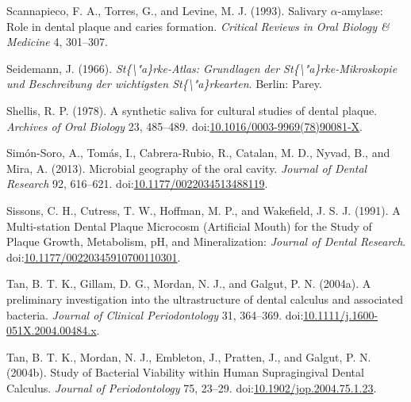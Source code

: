 \documentclass[utf8]{frontiers/frontiersSCNS}
\newlength{\cslhangindent}
\newlength{\cslentryspacingunit} %
\newenvironment{CSLReferences}[2] %
 {%
  \setlength{\parindent}{0pt}
  \ifodd #1
  \let\oldpar\par
  \def\par{\hangindent=\cslhangindent\oldpar}
  \fi
  \setlength{\parskip}{#2\cslentryspacingunit}
 }%
 {}
\begin{document}
\begin{CSLReferences}{1}{0}
\leavevmode{}%
Scannapieco, F. A., Torres, G., and Levine, M. J. (1993). Salivary {\(\alpha\)}-amylase: Role in dental plaque and caries formation. \emph{Critical Reviews in Oral Biology \& Medicine} 4, 301--307.

\leavevmode{}%
Seidemann, J. (1966). \emph{St\{\textbackslash"a\}rke-{Atlas}: {Grundlagen} der {St}\{\textbackslash"a\}rke-{Mikroskopie} und {Beschreibung} der wichtigsten {St}\{\textbackslash"a\}rkearten}. {Berlin}: {Parey}.

\leavevmode{}%
Shellis, R. P. (1978). A synthetic saliva for cultural studies of dental plaque. \emph{Archives of Oral Biology} 23, 485--489. doi:\href{https://doi.org/10.1016/0003-9969(78)90081-X}{10.1016/0003-9969(78)90081-X}.

\leavevmode{}%
Simón-Soro, A., Tomás, I., Cabrera-Rubio, R., Catalan, M. D., Nyvad, B., and Mira, A. (2013). Microbial geography of the oral cavity. \emph{Journal of Dental Research} 92, 616--621. doi:\href{https://doi.org/10.1177/0022034513488119}{10.1177/0022034513488119}.

\leavevmode{}%
Sissons, C. H., Cutress, T. W., Hoffman, M. P., and Wakefield, J. S. J. (1991). A {Multi-station Dental Plaque Microcosm} ({Artificial Mouth}) for the {Study} of {Plaque Growth}, {Metabolism}, {pH}, and {Mineralization}: \emph{Journal of Dental Research}. doi:\href{https://doi.org/10.1177/00220345910700110301}{10.1177/00220345910700110301}.

\leavevmode{}%
Tan, B. T. K., Gillam, D. G., Mordan, N. J., and Galgut, P. N. (2004a). A preliminary investigation into the ultrastructure of dental calculus and associated bacteria. \emph{Journal of Clinical Periodontology} 31, 364--369. doi:\href{https://doi.org/10.1111/j.1600-051X.2004.00484.x}{10.1111/j.1600-051X.2004.00484.x}.

\leavevmode{}%
Tan, B. T. K., Mordan, N. J., Embleton, J., Pratten, J., and Galgut, P. N. (2004b). Study of {Bacterial Viability} within {Human Supragingival Dental Calculus}. \emph{Journal of Periodontology} 75, 23--29. doi:\href{https://doi.org/10.1902/jop.2004.75.1.23}{10.1902/jop.2004.75.1.23}.


\end{CSLReferences}
\end{document}
